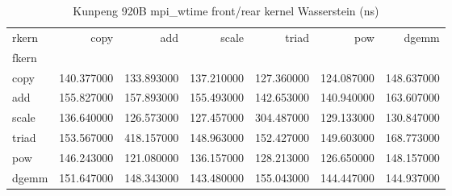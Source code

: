 \begin{table}
\caption{Kunpeng 920B mpi_wtime front/rear kernel Wasserstein (ns)}
\begin{tabular}{lrrrrrr}
\toprule
rkern & copy & add & scale & triad & pow & dgemm \\
fkern &  &  &  &  &  &  \\
\midrule
copy & 140.377000 & 133.893000 & 137.210000 & 127.360000 & 124.087000 & 148.637000 \\
add & 155.827000 & 157.893000 & 155.493000 & 142.653000 & 140.940000 & 163.607000 \\
scale & 136.640000 & 126.573000 & 127.457000 & 304.487000 & 129.133000 & 130.847000 \\
triad & 153.567000 & 418.157000 & 148.963000 & 152.427000 & 149.603000 & 168.773000 \\
pow & 146.243000 & 121.080000 & 136.157000 & 128.213000 & 126.650000 & 148.157000 \\
dgemm & 151.647000 & 148.343000 & 143.480000 & 155.043000 & 144.447000 & 144.937000 \\
\bottomrule
\end{tabular}
\end{table}
